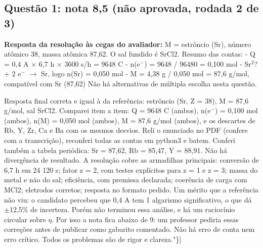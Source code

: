 \documentclass{article}%
\begin{document}
\subsection*{Questão 1: nota 8,5 (não aprovada, rodada 2 de 3)}%
\textbf{Resposta da resolução às cegas do avaliador:} M = estrôncio (Sr), número atômico 38, massa atômica 87,62. O sal fundido é SrCl2.\newline%
\newline%
Resumo das contas:\newline%
{-} Q = 0,4 A $\times$ 6,7 h $\times$ 3600 s/h = 9648 C\newline%
{-} n(e$^{-}$) = 9648 / 96480 = 0,100 mol\newline%
{-} Sr$^2$? + 2 e$^{-}$ $\to$ Sr, logo n(Sr) = 0,050 mol\newline%
{-} M = 4,38 g / 0,050 mol = 87,6 g/mol, compatível com Sr (87,62)\newline%
\newline%
Não há alternativas de múltipla escolha nesta questão.\par %
Resposta final correta e igual à da referência: estrôncio (Sr, Z = 38), M = 87,6 g/mol, sal SrCl2. Comparei item a item: Q = 9648 C (ambos), n(e$^{-}$) = 0,100 mol (ambos), n(M) = 0,050 mol (ambos), M = 87,6 g/mol (ambos), e os descartes de Rb, Y, Zr, Ca e Ba com os mesmos desvios. Reli o enunciado no PDF (confere com a transcrição), reconferi todas as contas em python3 e batem. Conferi também a tabela periódica: Sr = 87,62, Rb = 85,47, Y = 88,91. Não há divergência de resultado.\newline%
\newline%
A resolução cobre as armadilhas principais: conversão de 6,7 h em 24 120 s; fator z = 2, com testes explícitos para z = 1 e z = 3; massa do metal e não do sal; eficiência, com premissa declarada; coerência de carga com MCl2; eletrodos corretos; resposta no formato pedido. Um mérito que a referência não viu: o candidato percebeu que 0,4 A tem 1 algarismo significativo, o que dá $\pm$12,5\% de incerteza. Porém não terminou essa análise, e há um raciocínio circular sobre $\eta$. Por isso a nota fica abaixo de 9: um professor pediria essas correções antes de publicar como gabarito comentado. Não há erro de conta nem erro crítico. Todos os problemas são de rigor e clareza."\}{]}%
\end{document}
